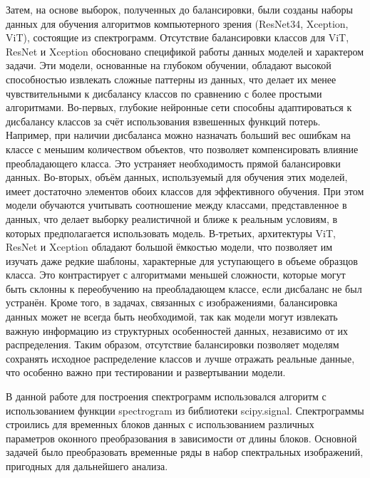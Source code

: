 \documentclass[spec, och, diploma]{SCWorks}
\begin{document}
        Затем, на основе выборок, полученных до балансировки, были созданы
        наборы данных для обучения алгоритмов компьютерного зрения (ResNet34,
        Xception, ViT), состоящие из спектрограмм. Отсутствие балансировки
        классов для ViT, ResNet и Xception обосновано спецификой работы данных
        моделей и характером задачи. Эти модели, основанные на глубоком
        обучении, обладают высокой способностью извлекать сложные паттерны из
        данных, что делает их менее чувствительными к дисбалансу классов по
        сравнению с более простыми алгоритмами. Во-первых, глубокие нейронные
        сети способны адаптироваться к дисбалансу классов за счёт использования
        взвешенных функций потерь. Например, при наличии дисбаланса можно
        назначать больший вес ошибкам на классе с меньшим количеством объектов,
        что позволяет компенсировать влияние преобладающего класса. Это
        устраняет необходимость прямой балансировки данных. Во-вторых, объём
        данных, используемый для обучения этих моделей, имеет достаточно
        элементов обоих классов для эффективного обучения. При этом модели
        обучаются учитывать соотношение между классами, представленное в данных,
        что делает выборку реалистичной и ближе к реальным условиям, в которых
        предполагается использовать модель. В-третьих, архитектуры ViT, ResNet и
        Xception обладают большой ёмкостью модели, что позволяет им изучать даже
        редкие шаблоны, характерные для уступающего в объеме образцов класса.
        Это контрастирует с алгоритмами меньшей сложности, которые могут быть
        склонны к переобучению на преобладающем классе, если дисбаланс не был
        устранён. Кроме того, в задачах, связанных с изображениями, балансировка
        данных может не всегда быть необходимой, так как модели могут извлекать
        важную информацию из структурных особенностей данных, независимо от их
        распределения. Таким образом, отсутствие балансировки позволяет моделям
        сохранять исходное распределение классов и лучше отражать реальные
        данные, что особенно важно при тестировании и развертывании модели.

        В данной работе для построения спектрограмм использовался алгоритм с
        использованием функции spectrogram из библиотеки scipy.signal.
        Спектрограммы строились для временных блоков данных с использованием
        различных параметров оконного преобразования в зависимости от длины
        блоков. Основной задачей было преобразовать временные ряды в набор
        спектральных изображений, пригодных для дальнейшего анализа.
\end{document}
